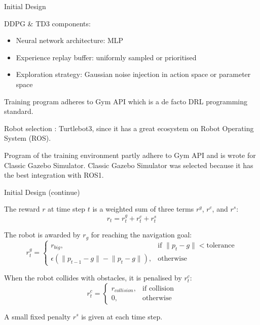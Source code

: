 \begin{frame}{Initial Design}

DDPG \& TD3 components:
\begin{itemize}
   \item Neural network architecture: MLP
   \item Experience replay buffer: uniformly sampled or prioritised
   \item Exploration strategy: Gaussian noise injection in action space or parameter space
\end{itemize}

\bigskip

Training program adheres to Gym API which is a de facto DRL programming standard.

\bigskip

Robot selection : Turtlebot3, since it has a great ecosystem on Robot Operating System (ROS).

\bigskip

Program of the training environment partly adhere to Gym API and is wrote for Classic Gazebo Simulator. Classic Gazebo Simulator was selected because it has the best integration with ROS1.

\bigskip

\end{frame}


\begin{frame}{Initial Design (continue)}

The reward $r$ at time step $t$ is a weighted sum of three terms $r^g$, $r^c$, and $r^s$:
\begin{equation*}
r_t = r_t^g + r_t^c + r_t^s
\end{equation*}

The robot is awarded by $r_g$ for reaching the navigation goal:
\begin{equation*}
r_t^g =
   \begin{cases}
   r_{big}, & \text{if } \lVert p_t - g \rVert < \text{tolerance} \\
   \epsilon(\lVert p_{t-1} - g \rVert - \lVert p_t - g \rVert), & \text{otherwise}
   \end{cases}
\end{equation*}

When the robot collides with obstacles, it is penalised by $r_t^c$:
\begin{equation*}
r_t^c =
   \begin{cases}
   r_{collision}, & \text{if collision} \\
   0, & \text{otherwise}
   \end{cases}
\end{equation*}

A small fixed penalty $r^s$ is given at each time step.

\end{frame}
